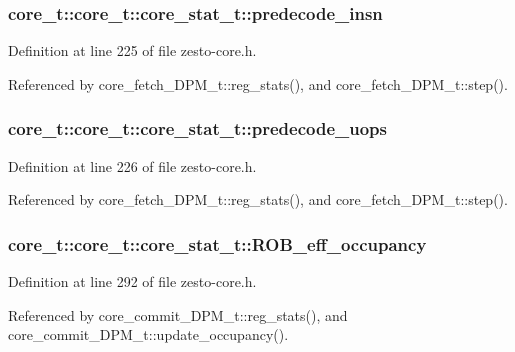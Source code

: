 \subsubsection[{predecode\_\-insn}]{ core\_\-t::core\_\-t::core\_\-stat\_\-t::predecode\_\-insn}\label{structcore__t_1_1core__stat__t_4a9ad360a954f4f585c2ee0aef869cd2}




Definition at line 225 of file zesto-core.h.

Referenced by core\_\-fetch\_\-DPM\_\-t::reg\_\-stats(), and core\_\-fetch\_\-DPM\_\-t::step().
\subsubsection[{predecode\_\-uops}]{ core\_\-t::core\_\-t::core\_\-stat\_\-t::predecode\_\-uops}\label{structcore__t_1_1core__stat__t_f3ac1b35fe9feda8dc990780e8562e6a}




Definition at line 226 of file zesto-core.h.

Referenced by core\_\-fetch\_\-DPM\_\-t::reg\_\-stats(), and core\_\-fetch\_\-DPM\_\-t::step().
\subsubsection[{ROB\_\-eff\_\-occupancy}]{ core\_\-t::core\_\-t::core\_\-stat\_\-t::ROB\_\-eff\_\-occupancy}\label{structcore__t_1_1core__stat__t_2bfcce3e6cb1e4fde8078e30842627e8}




Definition at line 292 of file zesto-core.h.

Referenced by core\_\-commit\_\-DPM\_\-t::reg\_\-stats(), and core\_\-commit\_\-DPM\_\-t::update\_\-occupancy().
